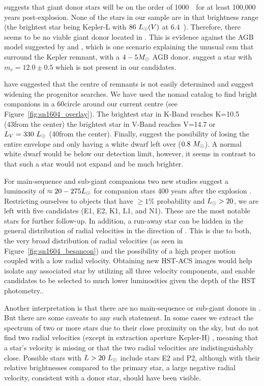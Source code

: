 \documentclass[preprint2]{aastex}
\begin{document}
\citet{2000ApJS..128..615M} suggests that giant donor stars will be on the order of 1000~\lsun\  for at least 100,000 years post-explosion. None of the stars in our sample are in that brightness range (the brightest star being Kepler-L with $86~\hbox{$L_{\odot}$}(V)$ at 6.4~\kpc). Therefore, there seems to be no viable giant donor located in . This is evidence against the AGB model suggested by \citet{2012A&A...537A.139C} and \citet{2013ApJ...764...63B}, which is one scenario explaining the unusual \gls{csm} that surround the Kepler remnant, with a $4 - 5 \hbox{$M_{\odot}$}$ AGB donor. \citet{2012A&A...537A.139C} suggest a star with $m_v=12.0 \pm 0.5$ which is not present in our candidates. 

\cite{2013arXiv1305.0567W} have suggested that the centre of remnants is not easily determined and suggest widening the progenitor searches. We have used the \gls{nomad} catalog to find bright companions in a 60\arcsec circle around our current centre (see Figure~\ref{fig:sn1604_overlay}). The brightest star in K-Band reaches K=10.5 (43\arcsec from the center)  the brightest star in V-Band reaches V=14.7 or $L_V=330~\hbox{$L_{\odot}$}$ (40\arcsec from the center).   Finally, \citet{2012A&A...537A.139C}  suggest the possibility of losing the entire envelope and only having a white dwarf left over ($0.8~\hbox{$M_{\odot}$}$).  A normal white dwarf would be below our detection limit, however, it seems in contrast to \citet{2000ApJS..128..615M} that such a star would not expand and be much brighter.


For main-sequence and sub-giant companions two new studies  \citep{2012arXiv1205.5028S,2012ApJ...760...21P} suggest a luminosity of $\approx 20 - 275 \hbox{$L_{\odot}$}$ for companion stars 400 years after the explosion \citep[see Figure~6 in ][]{2012ApJ...760...21P}. Restricting ourselves to objects that have $\ge 1 \%$ probability and $\hbox{$L_{\odot}$} > 20$, we are left with five candidates (E1, E2, K1, L1, and N1). These are the most notable stars for further follow-up. In addition, a run-away star can be hidden in the general distribution of radial velocities in the direction of . This is due to both, the very broad distribution of radial velocities (as seen in Figure~\ref{fig:sn1604_besancon}) and the possibility of a high proper motion coupled with a low radial velocity. Obtaining new HST-ACS images would help isolate any associated star by utilizing all three velocity components, and enable candidates to be selected to much lower luminosities given the depth of the HST photometry.. 

Another interpretation is that there are no main-sequence or sub-giant donors in . But there are some caveats to any such statement.  In some cases we extract the spectrum of two or more stars due to their close proximity on the sky, but do not find two radial velocities (except in extraction aperture Kepler-H) , meaning that a star's velocity is missing or that the two radial velocities are indistinguishably close. Possible stars with $L>20~\hbox{$L_{\odot}$}$ include stars E2 and P2, although with their relative brightnesses compared to the primary star, a large negative radial velocity, consistent with a donor star, should have been visible.
 
\end{document}
